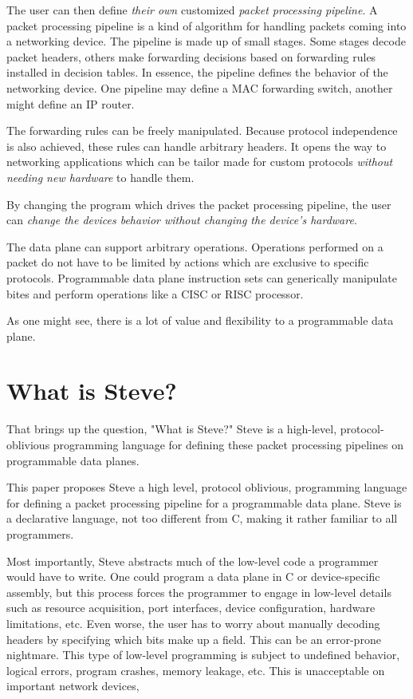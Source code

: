 The user can then define \textit{their own} customized \textit{packet processing pipeline}. A packet processing pipeline is a kind of algorithm for handling packets coming into a networking device. The pipeline is made up of small stages. Some stages decode packet headers, others make forwarding decisions based on forwarding rules installed in decision tables. In essence, the pipeline defines the behavior of the networking device. One pipeline may define a MAC forwarding switch, another might define an IP router.

The forwarding rules can be freely manipulated. Because protocol independence is also achieved, these rules can handle arbitrary headers. It opens the way to networking applications which can be tailor made for custom protocols \textit{without needing new hardware} to handle them.

By changing the program which drives the packet processing pipeline, the user can \textit{change the devices behavior without changing the device's hardware}.

The data plane can support arbitrary operations. Operations performed on a packet do not have to be limited by actions which are exclusive to specific protocols. Programmable data plane instruction sets can generically manipulate bites and perform operations like a CISC or RISC processor.

As one might see, there is a lot of value and flexibility to a programmable data plane. 

\section{What is Steve?}

That brings up the question, "What is Steve?" Steve is a high-level, protocol-oblivious programming language for defining these packet processing pipelines on programmable data planes.

This paper proposes Steve a high level, protocol oblivious, programming language for defining a packet processing pipeline for a programmable data plane. Steve is a declarative language, not too different from C, making it rather familiar to all programmers.

Most importantly, Steve abstracts much of the low-level code a programmer would have to write. One could program a data plane in C or device-specific assembly, but this process forces the programmer to engage in low-level details such as resource acquisition, port interfaces, device configuration, hardware limitations, etc. Even worse, the user has to worry about manually decoding headers by specifying which bits make up a field. This can be an error-prone nightmare. This type of low-level programming is subject to undefined behavior, logical errors, program crashes, memory leakage, etc. This is unacceptable on important network devices,


